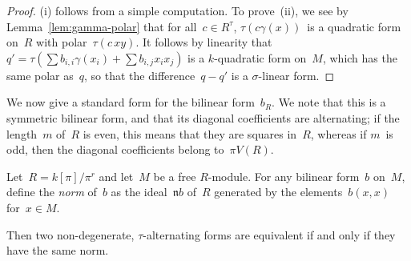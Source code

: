 \documentclass{article}
\def\mat#1{\begin{pmatrix}#1\end{pmatrix}}
\DeclareMathOperator\Quad{Quad}
\DeclareMathOperator\Alt{Alt}
\def\kR{_{(k,R)}}
\let\fr\mathfrak
\begin{document}
\begin{proof}
(i) follows from a simple computation. To prove~(ii), we see by
Lemma~\ref{lem:gamma-polar} that for all~$c ∈ R^{τ}$, $τ(c γ(x))$~is a
quadratic form on~$R$ with polar~$τ(c\, xy)$. It follows by linearity
that~$q' = τ(∑ b_{i,i} γ(x_i) + ∑ b_{i,j} x_i x_j)$ is a $k$-quadratic
form on~$M$, which has the same polar as~$q$, so that
the difference~$q - q'$ is a $σ$-linear form.
\end{proof}


We now give a standard form for the bilinear form~$b_R$. We note that
this is a symmetric bilinear form, and that its diagonal coefficients are
alternating; if the length~$m$ of~$R$ is even, this means that they are
squares in~$R$, whereas if $m$~is odd, then the diagonal coefficients
belong to~$π V(R)$.


\begin{prop}\label{prop:eqv-norm}
Let~$R = k[π]/π^r$ and let~$M$ be a free $R$-module. For any bilinear
form~$b$ on~$M$, define the \emph{norm} of~$b$ as the ideal~$\fr n b$ of~$R$
generated by the elements~$b(x, x)$ for~$x ∈ M$.

Then two non-degenerate, $τ$-alternating forms are equivalent if and only
if they have the same norm.
\end{prop}

\end{document}
